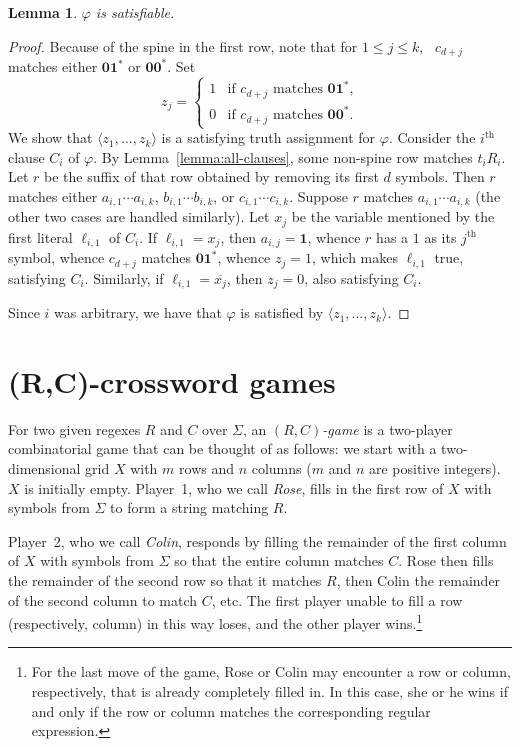 \documentclass{article}
\newcommand{\0}{\mathbf{0}}
\newcommand{\1}{\mathbf{1}}
\newcommand{\2}{\mathbf{2}}
\renewcommand{\p}{\varphi}
\newcommand{\tup}[1]{\langle{} #1 \rangle{}}
\newcounter{row}
\newcounter{col}
\theoremstyle{plain}
\newtheorem{lemma}[theorem]{Lemma}
\theoremstyle{definition}
\begin{document}
\begin{lemma}
  $\p$ is satisfiable.
\end{lemma}

\begin{proof}
  Because of the spine in the first row, note that for $1\le j\le k$, \ $c_{d+j}$ matches either $\0\1^*$ or $\0\0^*$.  Set \[ z_j = \left\{\begin{array}{ll}
      1 & \mbox{if $c_{d+j}$ matches $\0\1^*$,} \\
      0 & \mbox{if $c_{d+j}$ matches $\0\0^*$.}
    \end{array}\right. \] We show that $\tup{z_1,\ldots,z_k}$ is a satisfying truth assignment for $\p$.  Consider the $i^\text{th}$ clause $C_i$ of $\p$.  By Lemma~\ref{lemma:all-clauses}, some non-spine row matches $t_iR_i$.  Let $r$ be the suffix of that row obtained by removing its first $d$ symbols.  Then $r$ matches either $a_{i,1}\cdots a_{i,k}$, $b_{i,1}\cdots b_{i,k}$, or $c_{i,1}\cdots c_{i,k}$.  Suppose $r$ matches $a_{i,1}\cdots a_{i,k}$ (the other two cases are handled similarly).  Let $x_j$ be the variable mentioned by the first literal $\ell_{i,1}$ of $C_i$.  If $\ell_{i,1} = x_j$, then $a_{i,j} = \1$, whence $r$ has a $1$ as its $j^{\text{th}}$ symbol, whence $c_{d+j}$ matches $\0\1^*$, whence $z_j = 1$, which makes $\ell_{i,1}$ true, satisfying $C_i$.  Similarly, if $\ell_{i,1} = \overline{x_j}$, then $z_j = 0$, also satisfying $C_i$.

  Since $i$ was arbitrary, we have that $\p$ is satisfied by $\tup{z_1,\ldots,z_k}$.
\end{proof}

\section{(R,C)-crossword games}\label{sec:pspace}

For two given regexes $R$ and $C$ over $\Sigma$, an \emph{$(R,C)$-game} is a two-player combinatorial game that can be thought of as follows: we start with a two-dimensional grid $X$ with $m$ rows and $n$ columns ($m$ and $n$ are positive integers).  $X$ is initially empty.  Player~1, who we call \emph{Rose}, fills in the first row of $X$ with symbols from $\Sigma$ to form a string matching $R$.

Player~2, who we call \emph{Colin}, responds by filling the remainder of the first column of $X$ with symbols from $\Sigma$ so that the entire column matches $C$.  Rose then fills the remainder of the second row so that it matches $R$, then Colin the remainder of the second column to match $C$, etc.  The first player unable to fill a row (respectively, column) in this way loses, and the other player wins.\footnote{For the last move of the game, Rose or Colin may encounter a row or column, respectively, that is already completely filled in.  In this case, she or he wins if and only if the row or column matches the corresponding regular expression.}
\end{document}
